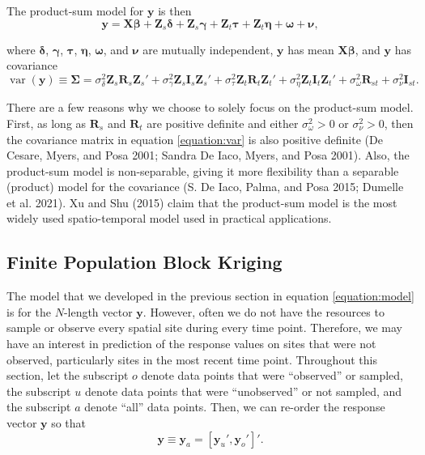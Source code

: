 \documentclass[smallextended]{svjour3}       %
\begin{document}
The product-sum model for \(\mathbf{y}\) is then \mbox{}
\begin{equation} \label{equation:model}
\mathbf{y} = \mathbf{X} \bm{\beta} + \mathbf{Z}_{s} \bm{\delta} + \mathbf{Z}_{s} \bm{\gamma} + \mathbf{Z}_t \bm{\tau} + \mathbf{Z}_t \bm{\eta} + \bm{\omega} + \bm{\nu},
\end{equation}

\noindent where \(\bm{\delta}\), \(\bm{\gamma}\), \(\bm{\tau}\),
\(\bm{\eta}\), \(\bm{\omega}\), and \(\bm{\nu}\) are mutually
independent, \(\mathbf{y}\) has mean \(\mathbf{X} \bm{\beta}\), and
\(\mathbf{y}\) has covariance \mbox{} \begin{equation}
\label{equation:var}
\mathop{\mathrm{{var}}}(\mathbf{y}) \equiv \bm{\Sigma} = \sigma^2_{\delta} \mathbf{Z}_{s} \mathbf{R}_{s} \mathbf{Z}_{s}' + \sigma^2_{\gamma} \mathbf{Z}_{s} \mathbf{I}_{s} \mathbf{Z}_{s}' + \sigma^2_{\tau} \mathbf{Z}_t \mathbf{R}_t \mathbf{Z}_t'+ \sigma^2_{\eta} \mathbf{Z}_t \mathbf{I}_t \mathbf{Z}_t' + \sigma^2_{\omega} \mathbf{R}_{st} + \sigma^2_{\nu} \mathbf{I}_{st}.
\end{equation}

\noindent There are a few reasons why we choose to solely focus on the
product-sum model. First, as long as \(\mathbf{R}_s\) and
\(\mathbf{R}_t\) are positive definite and either
\(\sigma^2_{\omega} > 0\) or \(\sigma^2_{\nu} > 0\), then the covariance
matrix in equation \ref{equation:var} is also positive definite (De
Cesare, Myers, and Posa 2001; Sandra De Iaco, Myers, and Posa 2001).
Also, the product-sum model is non-separable, giving it more flexibility
than a separable (product) model for the covariance (S. De Iaco, Palma,
and Posa 2015; Dumelle et al. 2021). Xu and Shu (2015) claim that the
product-sum model is the most widely used spatio-temporal model used in
practical applications.

\hypertarget{subsection:fpbk}{%
\subsection{Finite Population Block Kriging}\label{subsection:fpbk}}

The model that we developed in the previous section in equation
\ref{equation:model} is for the \(N\)-length vector \(\mathbf{y}\).
However, often we do not have the resources to sample or observe every
spatial site during every time point. Therefore, we may have an interest
in prediction of the response values on sites that were not observed,
particularly sites in the most recent time point. Throughout this
section, let the subscript \(o\) denote data points that were
``observed'' or sampled, the subscript \(u\) denote data points that
were ``unobserved'' or not sampled, and the subscript \(a\) denote
``all'' data points. Then, we can re-order the response vector
\(\mathbf{y}\) so that \mbox{} \begin{equation} \label{equation:ordered}
\mathbf{y} \equiv \mathbf{y}_a = [\mathbf{y}_u', \mathbf{y}_o']'.
\end{equation}
\end{document}
